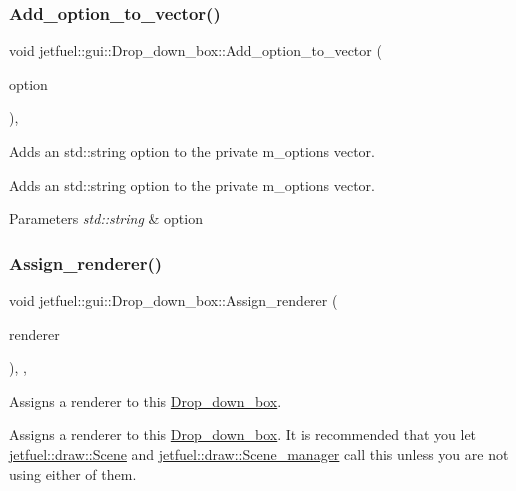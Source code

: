 \subsubsection{\texorpdfstring{Add\+\_\+option\+\_\+to\+\_\+vector()}{Add\_option\_to\_vector()}}
{\footnotesize\ttfamily void jetfuel\+::gui\+::\+Drop\+\_\+down\+\_\+box\+::\+Add\+\_\+option\+\_\+to\+\_\+vector (\begin{DoxyParamCaption}\item[{const std\+::string}]{option }\end{DoxyParamCaption})\hspace{0.3cm}{\ttfamily [inline]}, {\ttfamily [protected]}}



Adds an std\+::string option to the private m\+\_\+options vector. 

Adds an std\+::string option to the private m\+\_\+options vector.


\begin{DoxyParams}{Parameters}
{\em std\+::string} & option \\
\hline
\end{DoxyParams}
\mbox{\label{classjetfuel_1_1gui_1_1Drop__down__box_a9160249744bdd278e20a77f470421d3e}} 
\subsubsection{\texorpdfstring{Assign\+\_\+renderer()}{Assign\_renderer()}}
{\footnotesize\ttfamily void jetfuel\+::gui\+::\+Drop\+\_\+down\+\_\+box\+::\+Assign\+\_\+renderer (\begin{DoxyParamCaption}\item[{S\+D\+L\+\_\+\+Renderer $\ast$}]{renderer }\end{DoxyParamCaption})\hspace{0.3cm}{\ttfamily [inline]}, {\ttfamily [override]}, {\ttfamily [virtual]}}



Assigns a renderer to this \hyperlink{classjetfuel_1_1gui_1_1Drop__down__box}{Drop\+\_\+down\+\_\+box}. 

Assigns a renderer to this \hyperlink{classjetfuel_1_1gui_1_1Drop__down__box}{Drop\+\_\+down\+\_\+box}. It is recommended that you let \hyperlink{classjetfuel_1_1draw_1_1Scene}{jetfuel\+::draw\+::\+Scene} and \hyperlink{classjetfuel_1_1draw_1_1Scene__manager}{jetfuel\+::draw\+::\+Scene\+\_\+manager} call this unless you are not using either of them.


